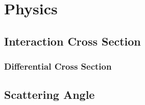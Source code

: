 \chapter{Physics}\label{sec:physics}
\section{Interaction Cross Section}

\subsection{Differential Cross Section}

\section{Scattering Angle}